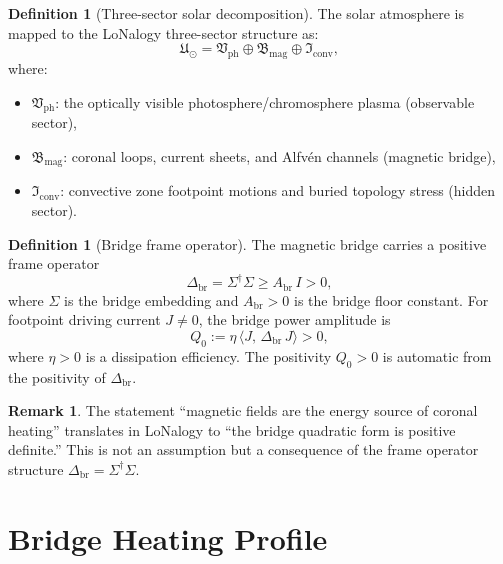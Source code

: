 \documentclass[12pt]{article}
\theoremstyle{plain}
\theoremstyle{definition}
\newtheorem{definition}[theorem]{Definition}
\newtheorem{remark}[theorem]{Remark}
\numberwithin{equation}{section}
\newcommand{\br}{\mathrm{br}}
\newcommand{\ph}{\mathrm{ph}}
\newcommand{\fU}{\mathfrak{U}}
\newcommand{\fI}{\mathfrak{I}}
\newcommand{\fV}{\mathfrak{V}}
\newcommand{\fB}{\mathfrak{B}}
\begin{document}
\begin{definition}[Three-sector solar decomposition]\label{def:solar}
The solar atmosphere is mapped to the LoNalogy three-sector
structure as:
\begin{equation}\label{eq:solarsectors}
\fU_\odot = \fV_{\ph}\oplus\fB_{\mathrm{mag}}\oplus\fI_{\mathrm{conv}},
\end{equation}
where:
\begin{itemize}
\item $\fV_{\ph}$: the optically visible photosphere/chromosphere
plasma (observable sector),
\item $\fB_{\mathrm{mag}}$: coronal loops, current sheets, and
Alfv\'en channels (magnetic bridge),
\item $\fI_{\mathrm{conv}}$: convective zone footpoint motions and
buried topology stress (hidden sector).
\end{itemize}
\end{definition}

\begin{definition}[Bridge frame operator]\label{def:bridgeop}
The magnetic bridge carries a positive frame operator
\begin{equation}\label{eq:frameop}
\Delta_{\br} = \Sigma^\dagger\Sigma \geq A_{\br}\,I > 0,
\end{equation}
where $\Sigma$ is the bridge embedding and $A_{\br}>0$ is the
bridge floor constant.  For footpoint driving current $J\neq 0$,
the bridge power amplitude is
\begin{equation}\label{eq:Q0}
\boxed{Q_0 := \eta\,\langle J,\,\Delta_{\br}\,J\rangle > 0,}
\end{equation}
where $\eta>0$ is a dissipation efficiency.  The positivity
$Q_0>0$ is automatic from the positivity of $\Delta_{\br}$.
\end{definition}

\begin{remark}
The statement ``magnetic fields are the energy source of coronal
heating'' translates in LoNalogy to ``the bridge quadratic form is
positive definite.''  This is not an assumption but a consequence
of the frame operator structure $\Delta_{\br}=\Sigma^\dagger\Sigma$.
\end{remark}


\section{Bridge Heating Profile}\label{sec:heating}
\end{document}
